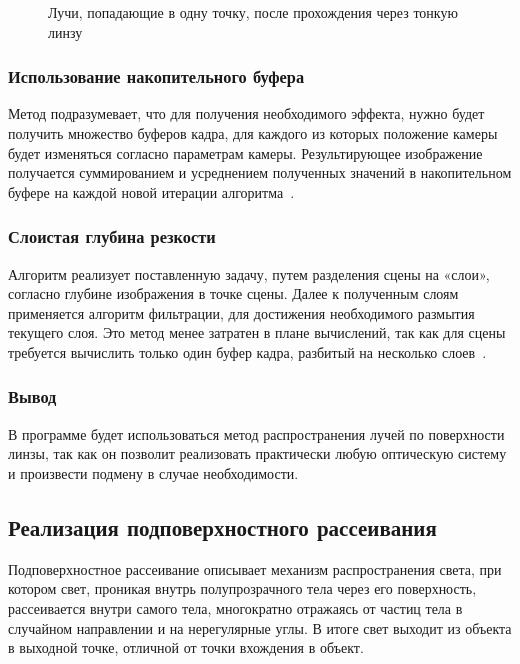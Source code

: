 \begin{figure}[h]
    \centering
    \def\svgwidth{0.6\textwidth}
    
    \caption{Лучи, попадающие в одну точку, после прохождения через тонкую
             линзу}
    \label{fig:lens}
\end{figure}

\subsubsection{Использование накопительного буфера}
Метод подразумевает, что для получения необходимого эффекта, нужно будет
получить множество буферов кадра, для каждого из которых положение камеры
будет изменяться согласно параметрам камеры. Результирующее изображение
получается суммированием и усреднением полученных значений в накопительном
буфере на каждой новой итерации алгоритма~\cite{GPUGems}.

\subsubsection{Слоистая глубина резкости}
Алгоритм реализует поставленную задачу, путем разделения сцены на «слои»,
согласно глубине изображения в точке сцены. Далее к полученным слоям
применяется алгоритм фильтрации, для достижения необходимого размытия
текущего слоя. Это метод менее затратен в плане вычислений, так как для сцены
требуется вычислить только один буфер кадра, разбитый на несколько слоев~\cite{GPUGems}.

\subsubsection*{Вывод}
В программе будет использоваться метод распространения лучей по
поверхности линзы, так как он позволит реализовать практически любую
оптическую систему и произвести подмену в случае необходимости.

\subsection{Реализация подповерхностного рассеивания}
Подповерхностное рассеивание описывает механизм распространения света,
при котором свет, проникая внутрь полупрозрачного тела через его поверхность,
рассеивается внутри самого тела, многократно отражаясь от частиц тела в
случайном направлении и на нерегулярные углы. В итоге свет выходит из объекта в
выходной точке, отличной от точки вхождения в объект.

